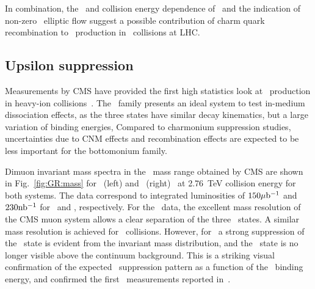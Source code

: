 In combination, the \pT\ and collision energy dependence of \jpsi \Raa\ and 
the indication of non-zero \jpsi\ elliptic flow suggest a possible  
contribution of charm quark recombination to \jpsi\ production in \PbPb\ collisions
at LHC.

\subsection{Upsilon suppression}

Measurements by CMS have provided the first high statistics look at \PgU\
production in heavy-ion collisions~\cite{CMS_Y_2010}.
The \PgU\ family presents an ideal system to test in-medium dissociation effects,
as the three states have similar decay kinematics, but a large variation of binding energies,
Compared to charmonium suppression studies, uncertainties due
to CNM effects and recombination effects are expected to be
less important for the bottomonium family.

Dimuon invariant mass spectra in the \PgU\ mass range obtained by CMS are shown in 
Fig.~\ref{fig:GR:mass} for \PbPb\ (left) and \pp\ (right)~\cite{Chatrchyan:2012lxa}
at 2.76~TeV collision energy for both systems. 
The data correspond to integrated luminosities of $150\mathrm{\mu b^{-1}}$ and $230 \mathrm{nb^{-1}}$ for
\PbPb\ and \pp, respectively. For the \pp\ data, the excellent mass resolution of the CMS muon system
allows a clear separation of the three \PgUn\ states. A similar mass resolution is achieved 
for \PbPb\ collisions.
However, for \PbPb\ a strong suppression of the \PgUb\ state is evident from the 
invariant mass distribution, and the \PgUc\ state is no longer visible above the continuum background. 
This is a striking visual confirmation of the expected
\PgU\ suppression pattern as a function of the \PgUn\ binding energy, and confirmed the 
first \PgU\ measurements reported in~\cite{CMS_Y_2010}.

